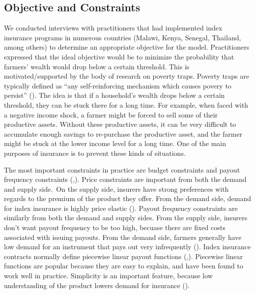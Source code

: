 \documentclass[11pt]{article}
\begin{document}
  \subsection{Objective and Constraints}
    We conducted interviews with practitioners that had implemented index insurance programs in numerous countries (Malawi, Kenya, Senegal, Thailand, among others) to determine an appropriate objective for the model. Practitioners expressed that the ideal objective would be to minimize the probability that farmers' wealth would drop below a certain threshold. This is motivated/supported by the body of research on poverty traps. Poverty traps are typically defined as ``any self-reinforcing mechanism which causes povery to persist'' (\cite{azariadis2005poverty}). The idea is that if a household's wealth drops below a certain threshold, they can be stuck there for a long time. For example, when faced with a negative income shock, a farmer might be forced to sell some of their productive assets. Without these productive assets, it can be very difficult to accumulate enough savings to re-purchase the productive asset, and the farmer might be stuck at the lower income level for a long time. One of the main purposes of insurance is to prevent these kinds of situations.  
    
    The most important constraints in practice are budget constraints and payout frequency constraints (\cite{osgood2007designing},\cite{world2011weather}). Price constraints are important from both the demand and supply side. On the supply side, insurers have strong preferences with regards to the premium of the product they offer. From the demand side, demand for index insurance is highly price elastic (\cite{jensen2017agricultural}). Payout frequency constraints are similarly from both the demand and supply sides. From the supply side, insurers don't want payout frequency to be too high, becuase there are fixed costs associated with issuing payouts. From the demand side, farmers generally have low demand for an instrument that pays out very infrequently (\cite{osgood2007designing}). Index insurance contracts normally define piecewise linear payout functions (\cite{world2011weather},\cite{chantarat2013designing}). Piecewise linear functions are popular because they are easy to explain, and have been found to work well in practice. Simplicity is an important feature, because low understanding of the product lowers demand for insurance (\cite{cai2020subsidy}).
\end{document}
